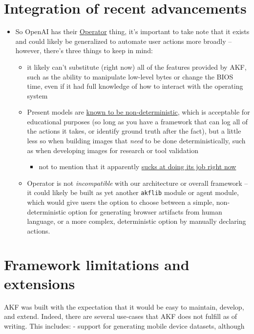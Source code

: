 \section{Integration of recent
advancements}\label{integration-of-recent-advancements}

\begin{itemize}
\tightlist
\item
  So OpenAI has their
  \href{https://openai.com/index/introducing-operator/}{Operator} thing,
  it's important to take note that it exists and could likely be
  generalized to automate user actions more broadly -- however, there's
  three things to keep in mind:

  \begin{itemize}
  \tightlist
  \item
    it likely can't substitute (right now) all of the features provided
    by AKF, such as the ability to manipulate low-level bytes or change
    the BIOS time, even if it had full knowledge of how to interact with
    the operating system
  \item
    Present models are
    \href{https://152334h.github.io/blog/non-determinism-in-gpt-4/}{known
    to be non-deterministic}, which is acceptable for educational
    purposes (so long as you have a framework that can log all of the
    actions it takes, or identify ground truth after the fact), but a
    little less so when building images that \emph{need} to be done
    deterministically, such as when developing images for research or
    tool validation

    \begin{itemize}
    \tightlist
    \item
      not to mention that it apparently
      \href{https://www.reddit.com/r/ChatGPTPro/comments/1i8jln3/i_am_among_the_first_people_to_gain_access_to/}{sucks
      at doing its job right now}
    \end{itemize}
  \item
    Operator is not \emph{incompatible} with our architecture or overall
    framework -- it could likely be built as yet another \texttt{akflib}
    module or agent module, which would give users the option to choose
    between a simple, non-deterministic option for generating browser
    artifacts from human language, or a more complex, deterministic
    option by manually declaring actions.
  \end{itemize}
\end{itemize}

\section{Framework limitations and
extensions}\label{framework-limitations-and-extensions}

AKF was built with the expectation that it would be easy to maintain,
develop, and extend. Indeed, there are several use-cases that AKF does
not fulfill as of writing. This includes: - support for generating
mobile device datasets, although
